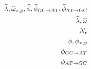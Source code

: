 \documentclass{article}
\begin{document}
\begin{align}
	\widehat{\lambda}, \widehat{\omega}_{x, y}, \widehat{\phi}, \widehat{\phi}_{\text{GC} \rightarrow \text{AT}}, \widehat{\phi}_{\text{AT} \rightarrow \text{GC}}  \\
	\widehat{\lambda}, \widehat{\omega} \\
	N_{\text{r}} \\
	\phi, \phi_{x, y}  \\
	\phi_{GC \rightarrow AT} \\
	\phi_{AT \rightarrow GC}
\end{align}
\end{document}
